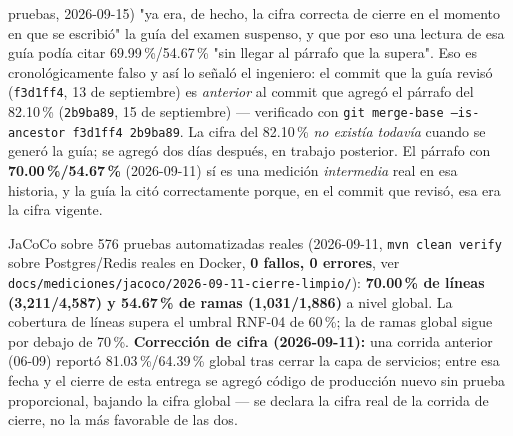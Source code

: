 pruebas, 2026-09-15) "ya era, de hecho, la cifra correcta de cierre en el momento en que se escribió" la
guía del examen suspenso, y que por eso una lectura de esa guía podía citar 69.99\,\%/54.67\,\% "sin
llegar al párrafo que la supera". Eso es cronológicamente falso y así lo señaló el ingeniero: el commit
que la guía revisó (\texttt{f3d1ff4}, 13 de septiembre) es \emph{anterior} al commit que agregó el
párrafo del 82.10\,\% (\texttt{2b9ba89}, 15 de septiembre) --- verificado con
\texttt{git merge-base --is-ancestor f3d1ff4 2b9ba89}. La cifra del 82.10\,\% \emph{no existía todavía}
cuando se generó la guía; se agregó dos días después, en trabajo posterior. El párrafo con
\textbf{70.00\,\%/54.67\,\%} (2026-09-11) sí es una medición \emph{intermedia} real en esa historia, y
la guía la citó correctamente porque, en el commit que revisó, esa era la cifra vigente.

JaCoCo sobre 576 pruebas automatizadas reales (2026-09-11, \texttt{mvn clean verify} sobre Postgres/Redis
reales en Docker, \textbf{0 fallos, 0 errores}, ver \texttt{docs/mediciones/jacoco/2026-09-11-cierre-limpio/}):
\textbf{70.00\,\% de líneas (3,211/4,587) y 54.67\,\% de ramas (1,031/1,886)} a nivel global. La
cobertura de líneas supera el umbral RNF-04 de 60\,\%; la de ramas global sigue por debajo de 70\,\%.
\textbf{Corrección de cifra (2026-09-11):} una corrida anterior (06-09) reportó 81.03\,\%/64.39\,\%
global tras cerrar la capa de servicios; entre esa fecha y el cierre de esta entrega se agregó código de
producción nuevo sin prueba proporcional, bajando la cifra global --- se declara la cifra real de la
corrida de cierre, no la más favorable de las dos.

